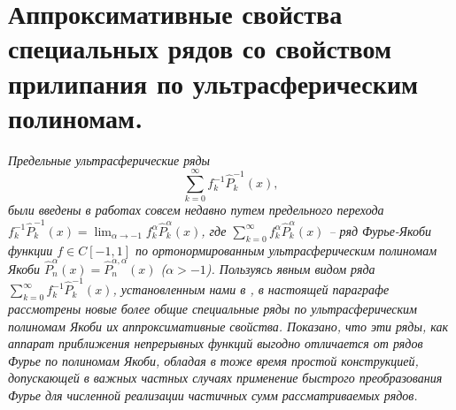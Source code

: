 \section{Аппроксимативные свойства специальных рядов со свойством прилипания по ультрасферическим полиномам.} \label{sect-2.1}

\textit{
Предельные ультрасферические ряды
$$
\sum_{k=0}^\infty f_k^{-1}\hat P_k^{-1}(x),
$$
были введены в работах \cite{shii1,shii2} %
 совсем недавно путем предельного перехода \linebreak $f_k^{-1}\hat P_k^{-1}(x)=\lim_{\alpha\to-1} f_k^{\alpha}\hat P_k^{\alpha}(x)$,
где $\sum_{k=0}^\infty f_k^{\alpha}\hat P_k^{\alpha}(x)$ -- ряд Фурье-Якоби функции $f\in C[-1,1]$ по ортонормированным ультрасферическим полиномам Якоби $\hat P_n^\alpha(x)=\hat P_n^{\alpha,\alpha}(x)$ ($\alpha>-1$).
Пользуясь явным видом  ряда $\sum_{k=0}^\infty f_k^{-1}\hat P_k^{-1}(x)$, установленным нами в \cite{shii1},  в настоящей параграфе рассмотрены новые более  общие специальные  ряды по  ультрасферическим  полиномам Якоби их аппроксимативные свойства. Показано, что эти   ряды, как аппарат приближения непрерывных функций выгодно  отличается от рядов Фурье по полиномам Якоби, обладая в тоже время простой конструкцией, допускающей в важных частных
 случаях  применение быстрого преобразования Фурье для численной реализации частичных  сумм рассматриваемых рядов.
}


